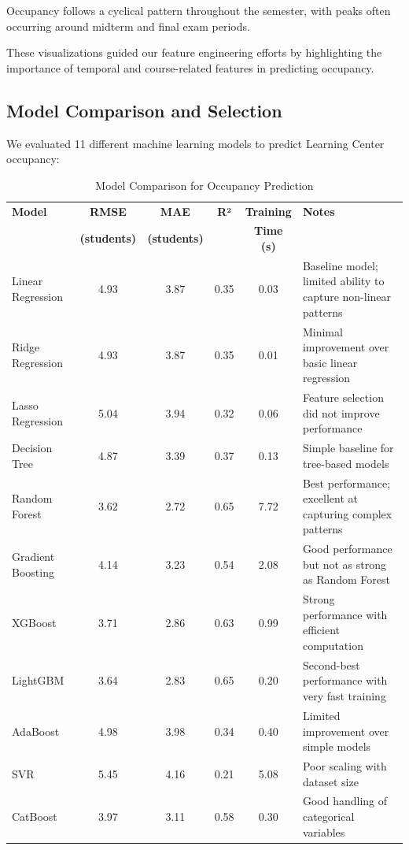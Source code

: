 \documentclass[12pt,letterpaper]{article}
\begin{document}
Occupancy follows a cyclical pattern throughout the semester, with peaks often occurring around midterm and final exam periods.

These visualizations guided our feature engineering efforts by highlighting the importance of temporal and course-related features in predicting occupancy.

\subsection{Model Comparison and Selection}

We evaluated 11 different machine learning models to predict Learning Center occupancy:

\begin{table}[H]
\centering
\begin{tabular}{lcccc|l}
\toprule
\textbf{Model} & \textbf{RMSE} & \textbf{MAE} & \textbf{R²} & \textbf{Training} & \textbf{Notes} \\
 & \textbf{(students)} & \textbf{(students)} & & \textbf{Time (s)} & \\
\midrule
Linear Regression & 4.93 & 3.87 & 0.35 & 0.03 & Baseline model; limited ability to capture non-linear patterns \\
Ridge Regression & 4.93 & 3.87 & 0.35 & 0.01 & Minimal improvement over basic linear regression \\
Lasso Regression & 5.04 & 3.94 & 0.32 & 0.06 & Feature selection did not improve performance \\
Decision Tree & 4.87 & 3.39 & 0.37 & 0.13 & Simple baseline for tree-based models \\
Random Forest & 3.62 & 2.72 & 0.65 & 7.72 & Best performance; excellent at capturing complex patterns \\
Gradient Boosting & 4.14 & 3.23 & 0.54 & 2.08 & Good performance but not as strong as Random Forest \\
XGBoost & 3.71 & 2.86 & 0.63 & 0.99 & Strong performance with efficient computation \\
LightGBM & 3.64 & 2.83 & 0.65 & 0.20 & Second-best performance with very fast training \\
AdaBoost & 4.98 & 3.98 & 0.34 & 0.40 & Limited improvement over simple models \\
SVR & 5.45 & 4.16 & 0.21 & 5.08 & Poor scaling with dataset size \\
CatBoost & 3.97 & 3.11 & 0.58 & 0.30 & Good handling of categorical variables \\
\bottomrule
\end{tabular}
\caption{Model Comparison for Occupancy Prediction}
\end{table}
\end{document}
